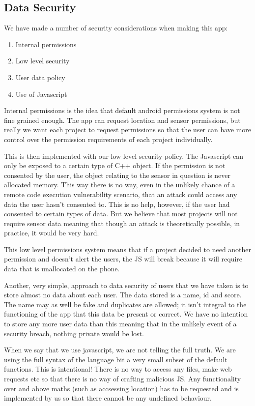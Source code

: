 \documentclass{article}
\begin{document}
\subsection{Data Security}
We have made a number of security considerations when making this app:
\begin{enumerate}
  \item{Internal permissions}
	\item{Low level security}
  \item{User data policy}
  \item{Use of Javascript}
\end{enumerate}
Internal permissions is the idea that default android permissions system is not fine grained enough. The app can request location and sensor
permissions, but really we want each project to request permissions so that the user can have more control over the permission requirements of
each project individually.

This is then implemented with our low level security policy. The Javascript can only be exposed to a certain type of C++ object.
If the permission is not consented by the user, the object relating to the sensor in question is never allocated memory. This way
there is no way, even in the unlikely chance of a remote code execution vulnerability scenario, that an attack could access any data
the user hasn't consented to. This is no help, however, if the user had consented to certain types of data. But we believe that most projects
will not require sensor data meaning that though an attack is theoretically possible, in practice, it would be very hard.

This low level permissions system means that if a project decided to need another permission and doesn't alert the users, the JS will break
because it will require data that is unallocated on the phone.

Another, very simple, approach to data security of users that we have taken is to store almost no data about each user. The data stored is
a name, id and score. The name may as well be fake and duplicates are allowed; it isn't integral to the functioning of the app that this data
be present or correct. We have no intention to store any more user data than this meaning  that in the unlikely event of a security breach,
nothing private would be lost.

When we say that we use javascript, we are not telling the full truth. We are using the full syntax of the language bit a very small
subset of the default functions. This is intentional! There is no way to access any files, make web requests etc so that there is
no way of crafting malicious JS. Any functionality over and above maths (such as accsessing location) has to be requested and is implemented
by us so that there cannot be any undefined behaviour.
\end{document}
